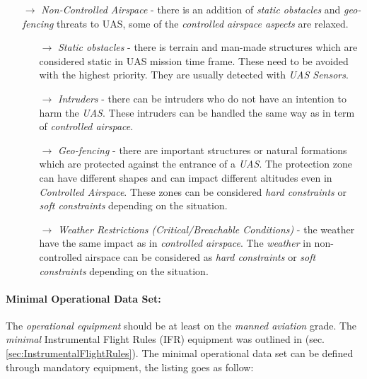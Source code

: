 \begin{itemize}
    \item[$\to$] \emph{Non-Controlled Airspace} - there is an addition of \emph{static obstacles} and \emph{geo-fencing} threats to UAS, some of the \emph{controlled airspace aspects} are relaxed.
    
    \begin{itemize}
        \item[$\to$] \emph{Static obstacles} - there is terrain and man-made structures which are considered static in UAS mission time frame. These need to be avoided with the highest priority. They are usually detected with \emph{UAS Sensors}.
        
        \item[$\to$] \emph{Intruders} - there can be intruders who do not have an intention to harm the \emph{UAS}. These intruders can be handled the same way as in term of \emph{controlled airspace}.
        
        \item[$\to$] \emph{Geo-fencing} - there are important structures or natural formations which are protected against the entrance of a \emph{UAS}. The protection zone can have different shapes and can impact different altitudes even in \emph{Controlled Airspace}. These zones can be considered \emph{hard constraints} or \emph{soft constraints} depending on the situation.
        
        \item[$\to$] \emph{Weather Restrictions (Critical/Breachable Conditions)} - the weather have the same impact as in \emph{controlled airspace}. The \emph{weather} in non-controlled airspace can be considered as \emph{hard constraints} or \emph{soft constraints} depending on the situation.
    \end{itemize}
\end{itemize}

\paragraph{Minimal Operational Data Set:} The \emph{operational equipment} should be at least on the \emph{manned aviation} grade. The \emph{minimal} Instrumental Flight Rules (IFR) equipment was outlined in (sec. \ref{sec:InstrumentalFlightRules}). The minimal operational data set can be defined through mandatory equipment, the listing goes as follow:

